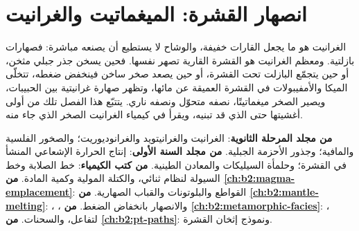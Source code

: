 \chapter{انصهار القشرة: الميغماتيت والغرانيت}\label{ch:b2:crustal-melting}

الغرانيت هو ما يجعل القارات خفيفة، والوشاح لا يستطيع أن يصنعه مباشرة: فصهارات
 بازلتية. ومعظم الغرانيت هو القشرة القارية تصهر نفسها.
فحين يسخن جذر جبلي مثخن، أو حين يتجمّع البازلت تحت القشرة، أو حين يصعد صخر
ساخن فينخفض ضغطه، تتخلّى الميكا والأمفيبولات في القشرة العميقة عن
مائها، وتظهر صهارة غرانيتية بين الحبيبات، ويصير الصخر
ميغماتيتًا، نصفه متحوّل ونصفه ناري. يتتبّع هذا الفصل تلك  من أولى
أغشيتها حتى  الذي قد تبنيه، ويقرأ في كيمياء الغرانيت الصخر الذي جاء
منه.

\begin{recall}
\textbf{من مجلد المرحلة الثانوية}: الغرانيت والغرانيتويد والغرانوديوريت؛ والصخور الفلسية والمافية؛
وجذور الأحزمة الجبلية. \textbf{من مجلد السنة الأولى}: إنتاج الحرارة الإشعاعي
المنشأ في القشرة؛ وحلمأة السيليكات والمعادن الطينية. \textbf{من كتب الكيمياء}: خط الصلابة وخط السيولة
لنظام ثنائي، والكتلة المولية وكمية المادة. \textbf{من
\cref{ch:b2:magma-emplacement}}: القواطع والبلوتونات والقباب الصهارية. \textbf{من
\cref{ch:b2:mantle-melting}}: ، ، والانصهار
بانخفاض الضغط. \textbf{من \cref{ch:b2:metamorphic-facies}}: ، 
لتفاعل، والسحنات. \textbf{من \cref{ch:b2:pt-paths}}: 
ونموذج إثخان القشرة.
\end{recall}

